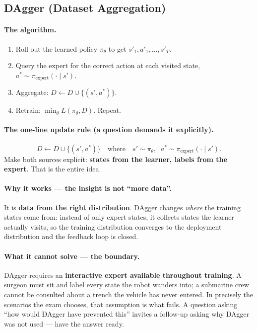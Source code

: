 \documentclass[11pt,a4paper]{article}
\begin{document}
\subsection{DAgger (Dataset Aggregation)}

\paragraph{The algorithm.}
\begin{enumerate}[label=\arabic*.]
\item Roll out the learned policy $\pi_\theta$ to get $s'_1,a'_1,\dots,s'_T$.
\item Query the expert for the correct action at each visited state,
$a^*\sim\pi_{\text{expert}}(\cdot\mid s')$.
\item Aggregate: $D\leftarrow D\cup\{(s',a^*)\}$.
\item Retrain: $\min_\theta L(\pi_\theta,D)$. Repeat.
\end{enumerate}

\paragraph{The one-line update rule (a question demands it explicitly).}
\[
\boxed{\;D \leftarrow D \cup \{(s',a^*)\}\quad\text{where}\quad s'\sim\pi_\theta,\;\; a^*\sim\pi_{\text{expert}}(\cdot\mid s').\;}
\]
Make both sources explicit: \textbf{states from the learner, labels from the
expert}. That is the entire idea.

\paragraph{Why it works --- the insight is not ``more data''.} It is
\textbf{data from the right distribution}. DAgger changes \emph{where} the
training states come from: instead of only expert states, it collects states
the learner actually visits, so the training distribution converges to the
deployment distribution and the feedback loop is closed.

\paragraph{What it cannot solve --- the boundary.} DAgger requires an
\textbf{interactive expert available throughout training}. A surgeon must sit
and label every state the robot wanders into; a submarine crew cannot be
consulted about a trench the vehicle has never entered. In precisely the
scenarios the exam chooses, that assumption is what fails. A question asking
``how would DAgger have prevented this'' invites a follow-up asking why
DAgger was not used --- have the answer ready.
\end{document}
